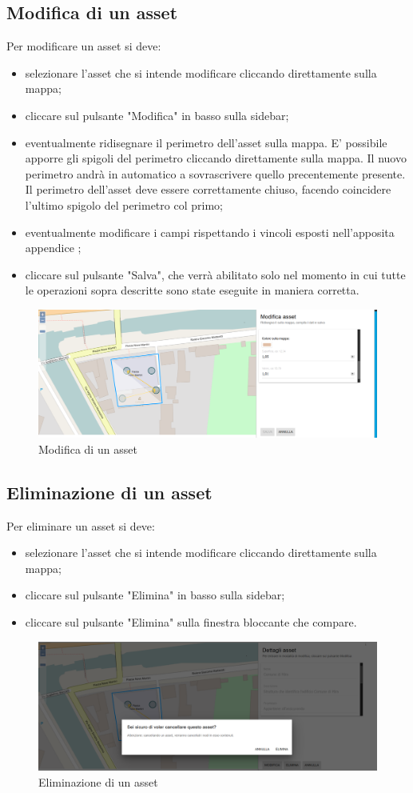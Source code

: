 \subsection{Modifica di un asset}
	Per modificare un asset si deve:
	\begin{itemize}
		\item selezionare l'asset che si intende modificare cliccando direttamente sulla mappa;
		\item cliccare sul pulsante "Modifica" in basso sulla sidebar;
		\item eventualmente ridisegnare il perimetro dell'asset sulla mappa. E' possibile apporre gli spigoli del perimetro cliccando direttamente sulla mappa. Il nuovo perimetro andrà in automatico a sovrascrivere quello precentemente presente. Il perimetro dell'asset deve essere correttamente chiuso, facendo coincidere l'ultimo spigolo del perimetro col primo;
		\item eventualmente modificare i campi rispettando i vincoli esposti nell'apposita appendice ;
		\item cliccare sul pulsante "Salva", che verrà abilitato solo nel momento in cui tutte le operazioni sopra descritte sono state eseguite in maniera corretta.
	\end{itemize}
	
	\begin{figure}[H]
	\centering
	\includegraphics[width=\textwidth]{img/modifica_asset.png}
	\caption{Modifica di un asset}
	\end{figure}

\subsection{Eliminazione di un asset}
Per eliminare un asset si deve:
\begin{itemize}
	\item selezionare l'asset che si intende modificare cliccando direttamente sulla mappa;
	\item cliccare sul pulsante "Elimina" in basso sulla sidebar;
	\item cliccare sul pulsante "Elimina" sulla finestra bloccante che compare.
\end{itemize}

\begin{figure}[H]
\centering
\includegraphics[width=\textwidth]{img/eliminazione_bloccante_asset.png}
\caption{Eliminazione di un asset}
\end{figure}